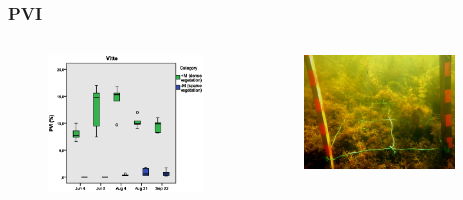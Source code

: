\documentclass[xcolor=dvipsnames]{beamer}
\begin{document}
\begin{frame}
\frametitle{PVI}
\begin{columns}
\begin{column}{7.0cm}
\begin{figure}
\includegraphics[width=\textwidth]{images/pvi/boxplot_pvi1.eps}
\hspace*{-9mm}
\end{figure}
\end{column}
\begin{column}{5.8cm}
\begin{figure}
\includegraphics[width=0.9\textwidth]{images/plotpictures/BSP_V+M}
\hspace*{+8mm}
\end{figure}
\end{column}
\end{columns}
\end{frame}
\end{document}
